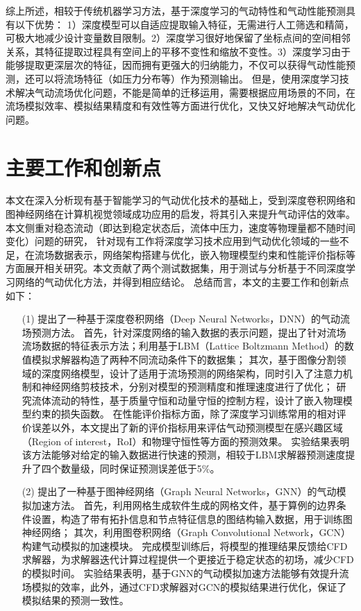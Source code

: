 综上所述，相较于传统机器学习方法，基于深度学习的气动特性和气动性能预测具有以下优势：
1）深度模型可以自适应提取输入特征，无需进行人工筛选和精简，可极大地减少设计变量数目限制。2）深度学习很好地保留了坐标点间的空间相邻关系，其特征提取过程具有空间上的平移不变性和缩放不变性。3）深度学习由于能够提取更深层次的特征，因而拥有更强大的归纳能力，不仅可以获得气动性能预测，还可以将流场特征（如压力分布等）作为预测输出。
但是，使用深度学习技术解决气动流场优化问题，不能是简单的迁移运用，需要根据应用场景的不同，在流场模拟效率、模拟结果精度和有效性等方面进行优化，又快又好地解决气动优化问题。

\section{主要工作和创新点}
本文在深入分析现有基于智能学习的气动优化技术的基础上，受到深度卷积网络和图神经网络在计算机视觉领域成功应用的启发，将其引入来提升气动评估的效率。
本文侧重对稳态流动（即达到稳定状态后，流体中压力，速度等物理量都不随时间变化）问题的研究，
针对现有工作将深度学习技术应用到气动优化领域的一些不足，在流场数据表示，网络架构搭建与优化，嵌入物理模型约束和性能评价指标等方面展开相关研究。本文贡献了两个测试数据集，用于测试与分析基于不同深度学习网络的气动优化方法，并得到相应结论。
总结而言，本文的主要工作和创新点如下：
\begin{itemize}
	\item[(1)] 提出了一种基于深度卷积网络（Deep Neural Networks，DNN）的气动流场预测方法。
	首先，针对深度网络的输入数据的表示问题，提出了针对流场流场数据的特征表示方法；利用基于LBM（Lattice Boltzmann Method）的数值模拟求解器构造了两种不同流动条件下的数据集；
	其次，基于图像分割领域的深度网络模型，设计了适用于流场预测的网络架构，同时引入了注意力机制和神经网络剪枝技术，分别对模型的预测精度和推理速度进行了优化；
	研究流体流动的特性，基于质量守恒和动量守恒的控制方程，设计了嵌入物理模型约束的损失函数。
	在性能评价指标方面，除了深度学习训练常用的相对评价误差以外，本文提出了新的评价指标用来评估气动预测模型在感兴趣区域（Region of  interest，RoI）和物理守恒性等方面的预测效果。
	实验结果表明该方法能够对给定的输入数据进行快速的预测，相较于LBM求解器预测速度提升了四个数量级，同时保证预测误差低于5\%。
		
	
	\item[(2)] 提出了一种基于图神经网络（Graph Neural  Networks，GNN）的气动模拟加速方法。
	首先，利用网格生成软件生成的网格文件，基于算例的边界条件设置，构造了带有拓扑信息和节点特征信息的图结构输入数据，用于训练图神经网络；
	其次，利用图卷积网络（Graph  Convolutional Network，GCN）构建气动模拟的加速模块。
	完成模型训练后，将模型的推理结果反馈给CFD求解器，为求解器迭代计算过程提供一个更接近于稳定状态的初场，减少CFD的模拟时间。
	实验结果表明，基于GNN的气动模拟加速方法能够有效提升流场模拟的效率，此外，通过CFD求解器对GCN的模拟结果进行优化，保证了模拟结果的预测一致性。
	
	
	
\end{itemize}

